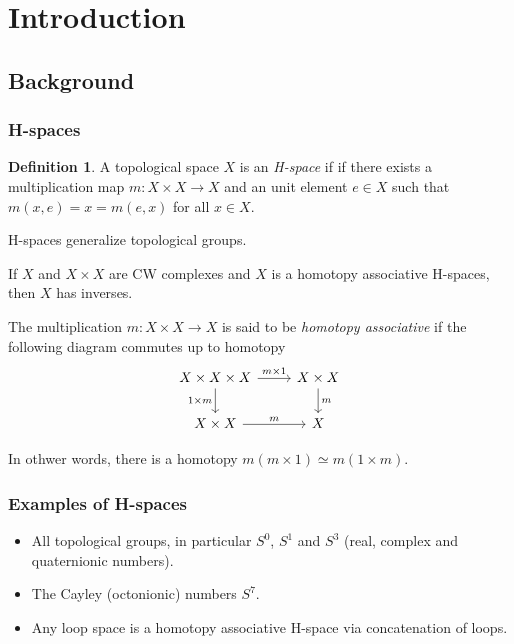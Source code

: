 \documentclass{beamer}
\theoremstyle{definition}
\newtheorem{defi}{Definition}
\begin{document}
\section{Introduction}

\subsection{Background}

\begin{frame}[fragile]
\frametitle{H-spaces}
\begin{defi}
A topological space $X$ is an \emph{H-space} if if there exists a multiplication map $m:X\times X\to X$ and an unit element $e\in X$ such that $m(x,e)=x=m(e,x)$ for all $x\in X$. %
\end{defi}\pause	
H-spaces generalize topological groups.\pause
\begin{lemma}[Sugawara]
If $X$ and $X\times X$ are CW complexes and $X$ is a homotopy associative H-spaces, then $X$ has inverses.
\end{lemma}

\end{frame}

\begin{frame}[fragile]

The multiplication $m:X\times X\to X$ is said to be \emph{homotopy associative} if the following diagram commutes up to homotopy
\[
\begin{tikzcd}
X\times X\times X\arrow[r,"m\times 1"]\arrow[d,"1\times m"']& X\times X\arrow[d,"m"]\\
X\times X\arrow[r,"m"]& X
\end{tikzcd}
\]\pause

In othwer words, there is a homotopy $m(m\times 1)\simeq m(1\times m)$.
\end{frame}




\begin{frame}
\frametitle{Examples of H-spaces}
\begin{itemize}
\item<1-> All topological groups, in particular $S^0$, $S^1$ and $S^3$ (real, complex and quaternionic numbers).
\item<2-> The Cayley (octonionic) numbers $S^7$.
\item<3-> Any loop space is a homotopy associative H-space via concatenation of loops. %
\end{itemize}
	
\end{frame}
\end{document}
